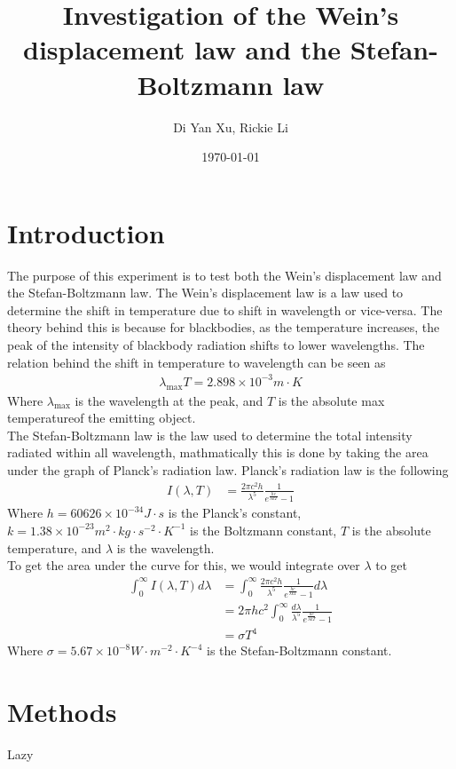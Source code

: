 \documentclass{article}
\title{Investigation of the Wein's displacement law and the Stefan-Boltzmann law}
\author{Di Yan Xu, Rickie Li}
\date{\today}
\begin{document}
\maketitle

\newpage

\section{Introduction}
The purpose of this experiment is to test both the Wein's displacement law and
the Stefan-Boltzmann law. The Wein's displacement law is a law used to determine
the shift in temperature due to shift in wavelength or vice-versa. The theory
behind this is because for blackbodies, as the temperature increases, the peak
of the intensity of blackbody radiation shifts to lower wavelengths. The relation
behind the shift in temperature to wavelength can be seen as
\begin{align*}
    \lambda_{\max}T = 2.898\times10^{-3}m\cdot K
\end{align*}
Where $\lambda_{\max}$ is the wavelength at the peak, and $T$ is the absolute max
temperatureof the emitting object.\\
The Stefan-Boltzmann law is the law used to determine the total intensity radiated
within all wavelength, mathmatically this is done by taking the area under the
graph of Planck's radiation law. Planck's radiation law is the following
\begin{align*}
    I(\lambda, T) &= \frac{2\pi c^2h}{\lambda^5}\frac{1}{e^{\frac{hc}{\lambda kT}} - 1}
\end{align*}
Where $h = 60626\times 10^{-34}J\cdot s$ is the Planck's constant, $k = 1.38
\times 10^{-23}m^2\cdot kg\cdot s^{-2}\cdot K^{-1}$ is the Boltzmann constant,
$T$ is the absolute temperature, and $\lambda$ is the wavelength.\\
To get the area under the curve for this, we would integrate over $\lambda$ to get
\begin{align*}
    \int_0^{\infty}I(\lambda, T) d\lambda &= \int_0^{\infty}
    \frac{2\pi c^2h}{\lambda^5}\frac{1}{e^{\frac{hc}{\lambda kT}} - 1}d\lambda\\
    &= 2\pi hc^2\int_0^{\infty}\frac{d\lambda}{\lambda^5}\frac{1}{e^{\frac{hc}{\lambda kT}} - 1}\\
    &= \sigma T^4
\end{align*}
Where $\sigma = 5.67 \times 10^{-8}W\cdot m^{-2}\cdot K^{-4}$ is the Stefan-Boltzmann
constant.

\newpage
\section{Methods}
Lazy
\end{document}
